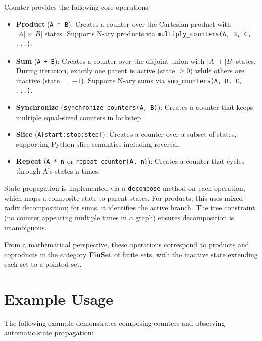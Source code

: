 \documentclass[10pt,a4paper,onecolumn]{article}
\begin{document}
Counter provides the following core operations:

\begin{itemize}
    \item \textbf{Product} (\texttt{A * B}): Creates a counter over the Cartesian
    product with $|A| \times |B|$ states. Supports N-ary products via
    \texttt{multiply\_counters(A, B, C, ...)}.

    \item \textbf{Sum} (\texttt{A + B}): Creates a counter over the disjoint union
    with $|A| + |B|$ states. During iteration, exactly one parent is active
    (state $\geq 0$) while others are inactive (state $= -1$). Supports N-ary
    sums via \texttt{sum\_counters(A, B, C, ...)}.

    \item \textbf{Synchronize} (\texttt{synchronize\_counters(A, B)}): Creates a
    counter that keeps multiple equal-sized counters in lockstep.

    \item \textbf{Slice} (\texttt{A[start:stop:step]}): Creates a counter over a
    subset of states, supporting Python slice semantics including reversal.

    \item \textbf{Repeat} (\texttt{A * n} or \texttt{repeat\_counter(A, n)}):
    Creates a counter that cycles through A's states n times.
\end{itemize}

State propagation is implemented via a \texttt{decompose} method on each operation,
which maps a composite state to parent states. For products, this uses mixed-radix
decomposition; for sums, it identifies the active branch. The tree constraint
(no counter appearing multiple times in a graph) ensures decomposition is
unambiguous.

From a mathematical perspective, these operations correspond to products and
coproducts in the category \textbf{FinSet} of finite sets, with the inactive
state extending each set to a pointed set.

\section{Example Usage}

The following example demonstrates composing counters and observing automatic
state propagation:
\end{document}
